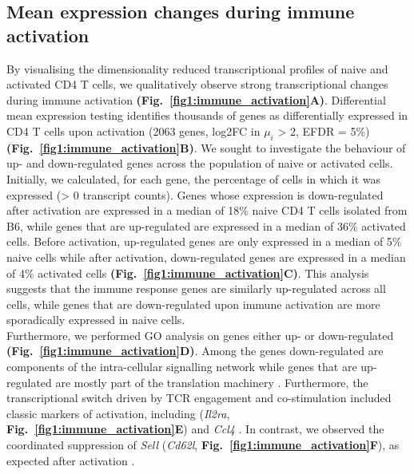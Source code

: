 \subsection{Mean expression changes during immune activation}

By visualising the dimensionality reduced transcriptional profiles of naive and activated CD4\plus{} T cells, we qualitatively observe strong transcriptional changes during immune activation \textbf{(Fig.~\ref{fig1:immune_activation}A)}. Differential mean expression testing identifies thousands of genes as differentially expressed in CD4\plus{} T cells upon activation (2063 genes, log2FC in $\mu_i$ > 2, EFDR = 5\%) \textbf{(Fig.~\ref{fig1:immune_activation}B)}. We sought to investigate the behaviour of up- and down-regulated genes across the population of naive or activated cells. Initially, we calculated, for each gene, the percentage of cells in which it was expressed (> 0 transcript counts). Genes whose expression is down-regulated after activation are expressed in a median of 18\% naive CD4\plus{} T cells isolated from B6, while genes that are up-regulated are expressed in a median of 36\% activated cells. Before activation, up-regulated genes are only expressed in a median of 5\% naive cells while after activation, down-regulated genes are expressed in a median of 4\% activated cells \textbf{(Fig.~\ref{fig1:immune_activation}C)}. This analysis suggests that the immune response genes are similarly up-regulated across all cells, while genes that are down-regulated upon immune activation are more sporadically expressed in naive cells. \\

Furthermore, we performed GO analysis on genes either up- or down-regulated \textbf{(Fig.~\ref{fig1:immune_activation}D)}. Among the genes down-regulated are components of the intra-cellular signalling network while genes that are up-regulated are mostly part of the translation machinery \citep{Bjur2013}. Furthermore, the transcriptional switch driven by TCR engagement and co-stimulation included classic markers of activation, including (\textit{\gls{Il2ra}}, \textbf{Fig.~\ref{fig1:immune_activation}E}) and \textit{\gls{Ccl4}} \citep{Asmal2003}. In contrast, we observed the coordinated suppression of \textit{Sell} (\textit{Cd62l}, \textbf{Fig.~\ref{fig1:immune_activation}F}), as expected after activation \citep{Park2005}.

\newpage

